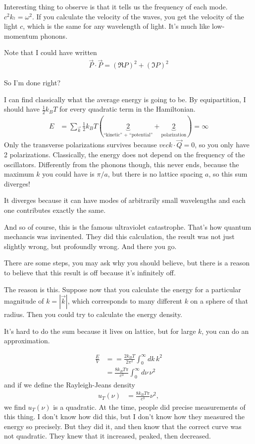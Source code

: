 Interesting thing to observe is that it tells us the frequency of each mode.
$c^2 k_^2 = \omega^2$.
If you calculate the velocity of the waves,
you get the velocity of the light $c$,
which is the same for any wavelength of light.
It's much like low-momentum phonons.

Note that I could have written
\begin{align}
    \vec{P}\cdot\vec{P} =
    \left( \Re P \right)^2 + \left( \Im P \right)^2
\end{align}

So I'm done right?

I can find classically what the average energy is going to be.
By equipartition,
I should have $\frac{1}{2}k_BT$ for every quadratic term in the Hamiltonian.
\begin{align}
    E &= \sum_{\vec{k}}\frac{1}{2}k_B T\left( 
    \underbrace{2}_{\textrm{``kinetic'' + ``potential''}}
    + \underbrace{2}_{\textrm{polarization}}
    \right) = \infty
\end{align}
Only the transverse polarizations survives because
$vec{k}\cdot\vec{Q}=0$,
so you only have 2 polarizations.
Classically,
the energy does not depend on the frequency of the oscillators.
Differently from the phonons though,
this never ends,
because the maximum $k$ you could have is $\pi/a$,
but there is no lattice spacing $a$,
so this sum diverges!

It diverges because it can have modes of arbitrarily small wavelengths and each
one contributes exactly the same.

And so of course,
this is the famous ultraviolet catastrophe.
That's how quantum mechancis was invinented.
They did this calculation,
the result was not just slightly wrong,
but profoundly wrong.
And there you go.

There are some steps,
you may ask why you should believe,
but there is a reason to believe that this result is off because it's infinitely
off.

The reason is this.
Suppose now that you calculate the energy for a particular magnitude of
$k=|\vec{k}|$,
which corresponds to many different $k$ on a sphere of that radius.
Then you could try to calculate the energy density.

It's hard to do the sum because it lives on lattice,
but for large $k$,
you can do an approximation.

\begin{align}
    \frac{E}{V} &=
    =
    \frac{2k_B T}{2\pi^2} \int_{0}^{\infty} dk\, k^2\\
    &=
    \frac{8 k_B T \pi}{c^3} \int_{0}^{\infty} d\nu\, \nu^2
\end{align}
and if we define the Rayleigh-Jeans density
\begin{align}
    u_T(\nu) &= \frac{8 k_B T \pi}{c^3} \nu^2,
\end{align}
we find $u_T(\nu)$ is a quadratic.
At the time,
people did precise measurements of this thing.
I don't know how did this,
but I don't know how they measured the energy so precisely.
But they did it,
and then know that the correct curve was not quadratic.
They knew that it increased, peaked,
then decreased.

